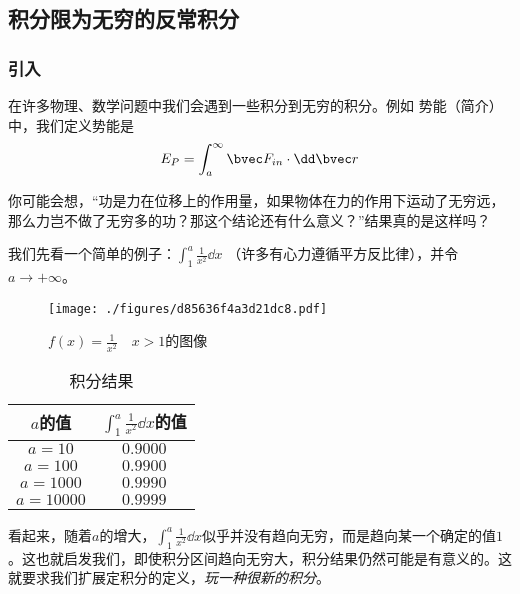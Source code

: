 \begin{issues}
\issueTODO
\issueDraft
\end{issues}

\subsection{积分限为无穷的反常积分}

\subsubsection{引入}
在许多物理、数学问题中我们会遇到一些积分到无穷的积分。例如 势能（简介） 中，我们定义势能是
$$E_P=\int ^\infty_a \bvec F_{in} \cdot \dd \bvec r$$

你可能会想，“功是力在位移上的作用量，如果物体在力的作用下运动了无穷远，那么力岂不做了无穷多的功？那这个结论还有什么意义？”结果真的是这样吗？

我们先看一个简单的例子：$\int^a_1 \frac{1}{x^2} \dd x$ （许多有心力遵循平方反比律），并令$a\to+\infty$。

\begin{figure}[ht]
\centering
\texttt{[image: ./figures/d85636f4a3d21dc8.pdf]}
\caption{$f(x)=\frac{1}{x^2} \quad x>1$的图像} \label{fig_impro_2}
\end{figure}

\begin{table}[ht]
\centering
\caption{积分结果}\label{tab_impro_1}
\begin{tabular}{|c|c|}
\hline
$a$的值 & $\int^a_1 \frac{1}{x^2} \dd x$的值 \\
\hline
$a=10$ & $0.9000$ \\
\hline
$a=100$ & $0.9900$ \\
\hline
$a=1000$ & $0.9990$ \\
\hline
$a=10000$& $0.9999$\\
\hline
\end{tabular}
\end{table}
看起来，随着$a$的增大，$\int^a_1 \frac{1}{x^2} \dd x$似乎并没有趋向无穷，而是趋向某一个确定的值$1$。这也就启发我们，即使积分区间趋向无穷大，积分结果仍然可能是有意义的。这就要求我们扩展定积分的定义，\textsl{玩一种很新的积分}。

